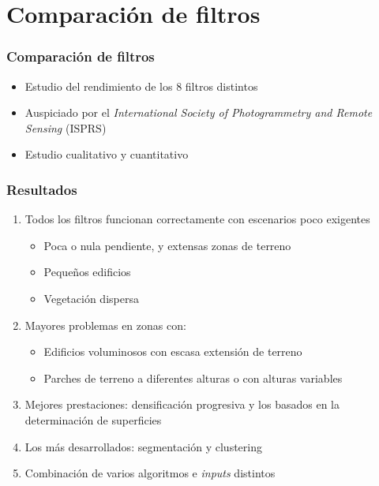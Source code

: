 \section{Comparación de filtros}
\begin{frame}
  \frametitle{Comparación de filtros}
    \begin{itemize}
      \item Estudio del rendimiento de los 8 filtros distintos 
      \item Auspiciado por el \emph{International Society of Photogrammetry and
        Remote Sensing} (\alert{ISPRS})
      \item Estudio cualitativo y cuantitativo
    \end{itemize}
\end{frame}
\begin{frame}
  \frametitle{Resultados}
  \begin{enumerate}
    \item Todos los filtros funcionan correctamente con escenarios poco exigentes
      \begin{itemize}
        \item Poca o nula pendiente, y extensas zonas de terreno
        \item Pequeños edificios
        \item Vegetación dispersa
      \end{itemize}
    \item Mayores problemas en zonas con:
      \begin{itemize}
        \item Edificios voluminosos con escasa extensión de terreno
        \item Parches de terreno a diferentes alturas o con alturas variables
      \end{itemize}
    \item<2-> Mejores prestaciones: \alert<2>{densificación progresiva} y los basados
      en la \alert<2>{determinación de superficies}
    \item<3-> Los más desarrollados: \alert<3>{segmentación y clustering}
    \item<4-> \alert<4>{Combinación} de varios algoritmos e \emph{inputs} distintos
  \end{enumerate}
\end{frame}
